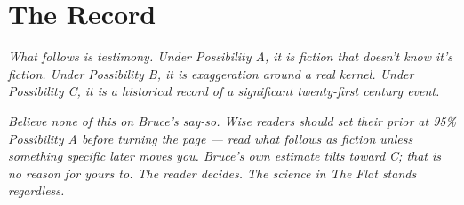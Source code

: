 \chapter*{The Record}
\label{record:intro}

\textit{What follows is testimony. Under Possibility A, it is fiction that doesn't know it's fiction. Under Possibility B, it is exaggeration around a real kernel. Under Possibility C, it is a historical record of a significant twenty-first century event.}

\textit{Believe none of this on Bruce's say-so. Wise readers should set their prior at 95\% Possibility A before turning the page --- read what follows as fiction unless something specific later moves you. Bruce's own estimate tilts toward C; that is no reason for yours to. The reader decides. The science in \textit{The Flat} stands regardless.}
